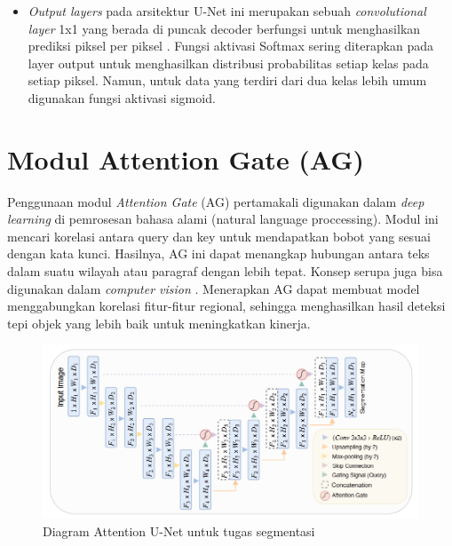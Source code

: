 \begin{itemize}
	\item \textit{Output layers}  pada arsitektur U-Net ini merupakan sebuah \textit{convolutional layer} 1x1 yang berada di puncak decoder berfungsi untuk menghasilkan prediksi piksel per piksel \cite{huang_fully_2022,azad_medical_2022}. Fungsi aktivasi Softmax sering diterapkan pada layer output untuk menghasilkan distribusi probabilitas setiap kelas pada setiap piksel. Namun, untuk data yang terdiri dari dua kelas lebih umum digunakan fungsi aktivasi sigmoid.
	
	
\end{itemize}



\section{Modul Attention Gate (AG)}

\noindent Penggunaan modul \textit{Attention Gate} (AG) pertamakali digunakan dalam \textit{deep learning} di pemrosesan bahasa alami (natural language proccessing)\cite{azad_medical_2022}. Modul ini mencari korelasi antara query dan key untuk mendapatkan bobot yang sesuai dengan kata kunci. Hasilnya, AG ini dapat menangkap hubungan antara teks dalam suatu wilayah atau paragraf dengan lebih tepat. Konsep serupa juga bisa digunakan dalam \textit{computer vision} \cite{huang_fully_2022}. Menerapkan AG dapat membuat model menggabungkan korelasi fitur-fitur regional, sehingga menghasilkan hasil deteksi tepi objek yang lebih baik untuk meningkatkan kinerja.

\begin{figure}[H]
	\centering
	\includegraphics[scale=.7]{gambar/AG-U.png}
	\caption{Diagram Attention U-Net untuk tugas segmentasi \cite{oktay_attention_2018}}
	\label{fig:Attention-U-net}
\end{figure}

